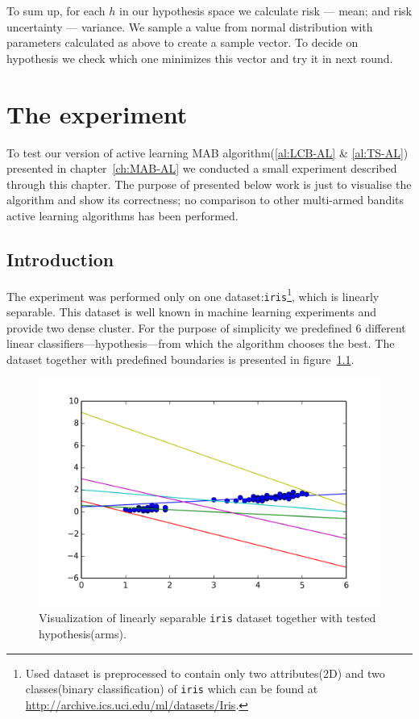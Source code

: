\documentclass[12pt, a4paper, pdflatex, leqno]{report}
\begin{document}
To sum up, for each $h$ in our hypothesis space we calculate risk --- mean; and risk uncertainty --- variance. We sample a value from normal distribution with parameters calculated as above to create a sample vector. To decide on hypothesis we check which one minimizes this vector and try it in next round.\\






\chapter{The experiment}
To test our version of active learning MAB algorithm(\ref{al:LCB-AL} \& \ref{al:TS-AL}) presented in chapter~\ref{ch:MAB-AL} we conducted a small experiment described through this chapter. The purpose of presented below work is just to visualise the algorithm and show its correctness; no comparison to other multi-armed bandits active learning algorithms has been performed.\\

\section{Introduction}
The experiment was performed only on one dataset:\texttt{iris}\footnote{Used dataset is preprocessed to contain only two attributes(2D) and two classes(binary classification) of \texttt{iris} which can be found at \url{http://archive.ics.uci.edu/ml/datasets/Iris}.}, which is linearly separable. This dataset is well known in machine learning experiments and provide two dense cluster. For the purpose of simplicity we predefined 6 different linear classifiers---hypothesis---from which the algorithm chooses the best. The dataset together with predefined boundaries is presented in figure~\ref{fig:hyp}.\\

\begin{figure}[htbp]
  \centering
  \includegraphics[width=0.7\linewidth]{graphics/gypothesis.png}
  \begin{tiny}
    \caption{Visualization of linearly separable \texttt{iris} dataset together with tested hypothesis(arms).\label{fig:hyp}}
  \end{tiny}
  \vspace{1cm}
\end{figure}
\end{document}
